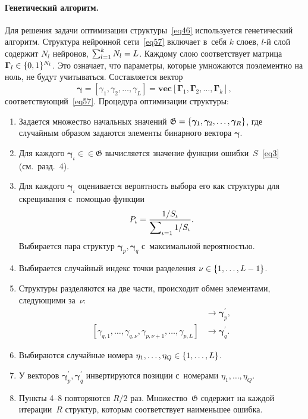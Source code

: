 \begin{multicols}{2}
\paragraph*{Генетический алгоритм.}
Для решения задачи оптимизации структуры~\eqref{eq46}  используется 
генетический алгоритм.
Структура нейронной сети~\eqref{eq57} включает в~себя $k$ слоев, $l$-й слой 
содержит $N_l$ нейронов, $\sum\nolimits_{l=1}^kN_l \hm= L$. Каждому слою 
соответствует матрица $\boldsymbol\Gamma_l \hm\in \{0,1\}^{N_l}$. Это 
означает, что па\-ра\-мет\-ры, которые умножаются поэлементно на ноль,  не будут 
учитываться. Составляется вектор
$$
\boldsymbol{\gamma} = 
[\gamma_1,\gamma_2,\dots,\gamma_L] = \mathbf{vec} 
[\boldsymbol\Gamma_1,\boldsymbol\Gamma_2,\dots,\boldsymbol\Gamma_k],
$$ 
соответствующий~\eqref{eq57}.
Процедура оптимизации структуры:
\begin{enumerate}
    \item Задается множество начальных значений $\mathfrak{G}\hm =  
\{\boldsymbol{\gamma}_1,\boldsymbol{\gamma}_2,\dots , \boldsymbol{\gamma}_R\}$, 
где случайным образом задаются элементы бинарного вектора 
$\boldsymbol{\gamma}$.
    \item Для каждого $\boldsymbol{\gamma}_\iota \in\in \mathfrak{G}$ 
вычисляется значение функции ошибки~$S$~\eqref{eq3} (см.\ разд.~4).
    \item Для каждого $\boldsymbol{\gamma}_\iota$ оценивается вероятность 
выбора его как структуры для \mbox{скрещивания} с~по\-мощью функции 
$$
P_\iota = \displaystyle\frac{\displaystyle 1/S_\iota\mathstrut}{\displaystyle \sum\nolimits_{\iota=1} 1/S_\iota\mathstrut}.
$$
 Выбирается пара 
структур $\boldsymbol{\gamma}_p,\boldsymbol{\gamma}_q$ с~максимальной 
вероятностью.
    \item Выбирается случайный индекс точки разделения $\nu\hm \in 
\{1,\ldots ,L-1\}$.
    \item Структуры разделяются на две части, происходит обмен элементами, 
следующими за~$\nu$:
   \begin{align*}
[\gamma_{p,1},\dots,\gamma_{p,\nu},\gamma_{q,\nu+1},\dots,\gamma_{q,L}]&\rightarrow 
\boldsymbol{\gamma}^{\prime}_p,
\\
[\gamma_{q,1},\dots,\gamma_{q,\nu},\gamma_{p,\nu+1},\dots,\gamma_{p,L}]&\rightarrow 
\boldsymbol{\gamma}^{\prime}_q.
\end{align*}
    \item Выбираются случайные номера $\eta_1,\dots,\eta_Q\hm \in 
\{1,\dots,L\}$.
    \item У векторов 
$\boldsymbol{\gamma}^{\prime}_p,\boldsymbol{\gamma}^{\prime}_q$ инвертируются 
позиции с~номерами $\eta_1,\dots,\eta_Q$.
    \item Пункты 4--8 повторяются $R/2$ раз. Множество~$\mathfrak{G}$ 
содержит на каждой итерации~$R$ структур, которым соответствует наименьшее 
\mbox{ошибка}.
    

\end{enumerate}
\end{multicols}
